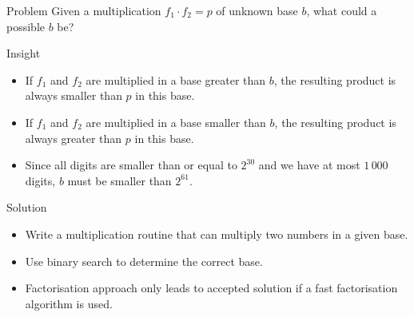 \begin{slide}
  \begin{block}{Problem}
    Given a multiplication $f_1 \cdot f_2 = p$ of unknown base $b$, what could a possible $b$ be?
  \end{block}
  \pause
  \begin{block}{Insight}
    \begin{itemize}
      \item If $f_1$ and $f_2$ are multiplied in a base greater than $b$, the resulting product
        is always smaller than $p$ in this base.
      \item If $f_1$ and $f_2$ are multiplied in a base smaller than $b$, the resulting product
        is always greater than $p$ in this base.
      \item Since all digits are smaller than or equal to $2^{30}$ and we have at most $1\,000$
        digits, $b$ must be smaller than $2^{61}$.
    \end{itemize}
  \end{block}
\end{slide}
\begin{slide}
  \begin{block}{Solution}
    \begin{itemize} 
      \item Write a multiplication routine that can multiply two numbers in a given base.
      \item Use binary search to determine the correct base.
      \pause
      \item Factorisation approach only leads to accepted solution if a fast factorisation algorithm is used.
    \end{itemize}
  \end{block}
\end{slide}
